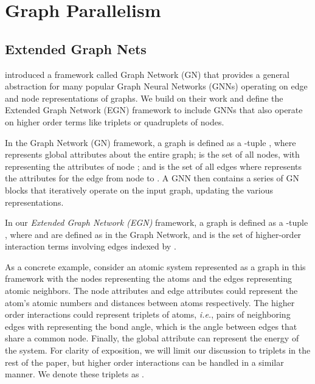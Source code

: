 \documentclass{article} \usepackage{iclr2022_conference,times}
\begin{document}
\section{Graph Parallelism}
\label{sec:graphparallel}

\subsection{Extended Graph Nets}
\label{sec:egn}

\cite{battaglia2018relational} introduced a framework called Graph Network (GN) that provides a general abstraction for many popular Graph Neural Networks (GNNs) operating on edge and node representations of graphs. We build on their work and define the Extended Graph Network (EGN) framework to include GNNs that also operate on higher order terms like triplets or quadruplets of nodes.

In the Graph Network (GN) framework, a graph is defined as a -tuple , where  represents global attributes about the entire graph;  is the set of all nodes, with  representing the attributes of node ; and  is the set of all edges where  represents the attributes for the edge from node  to . A GNN then contains a series of GN blocks
that iteratively operate on the input graph, updating the various representations.

In our \emph{Extended Graph Network (EGN)} framework, a graph is defined as a -tuple , where  and  are defined as in the Graph Network, and  is the set of higher-order interaction terms involving edges indexed by .

As a concrete example, consider an atomic system represented as a graph in this framework with the nodes representing the atoms and the edges representing atomic neighbors. The node attributes  and edge attributes  could represent the atom's atomic numbers and distances between atoms respectively. The higher order interactions could represent triplets of atoms, \textit{i.e.}, pairs of neighboring edges with  representing the bond angle, which is the angle between edges that share a common node.
Finally, the global attribute 
can represent the energy of the system. For clarity of exposition, we will limit our discussion to triplets in the rest of the paper, but higher order interactions can be handled in a similar manner. We denote these triplets as .
\end{document}
